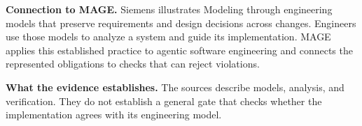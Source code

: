 \textbf{Connection to MAGE.} Siemens illustrates Modeling through engineering models that preserve requirements and design decisions across changes. Engineers use those models to analyze a system and guide its implementation. MAGE applies this established practice to agentic software engineering and connects the represented obligations to checks that can reject violations.

\textbf{What the evidence establishes.} The sources describe models, analysis, and verification. They do not establish a general gate that checks whether the implementation agrees with its engineering model.
